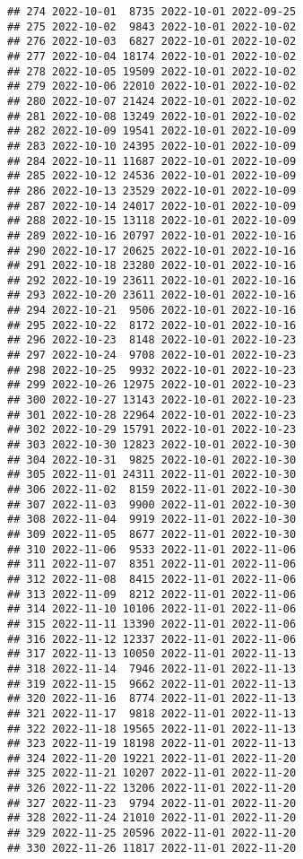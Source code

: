 \documentclass[
]{article}
\begin{document}
\begin{verbatim}
## 274 2022-10-01  8735 2022-10-01 2022-09-25
## 275 2022-10-02  9843 2022-10-01 2022-10-02
## 276 2022-10-03  6827 2022-10-01 2022-10-02
## 277 2022-10-04 18174 2022-10-01 2022-10-02
## 278 2022-10-05 19509 2022-10-01 2022-10-02
## 279 2022-10-06 22010 2022-10-01 2022-10-02
## 280 2022-10-07 21424 2022-10-01 2022-10-02
## 281 2022-10-08 13249 2022-10-01 2022-10-02
## 282 2022-10-09 19541 2022-10-01 2022-10-09
## 283 2022-10-10 24395 2022-10-01 2022-10-09
## 284 2022-10-11 11687 2022-10-01 2022-10-09
## 285 2022-10-12 24536 2022-10-01 2022-10-09
## 286 2022-10-13 23529 2022-10-01 2022-10-09
## 287 2022-10-14 24017 2022-10-01 2022-10-09
## 288 2022-10-15 13118 2022-10-01 2022-10-09
## 289 2022-10-16 20797 2022-10-01 2022-10-16
## 290 2022-10-17 20625 2022-10-01 2022-10-16
## 291 2022-10-18 23280 2022-10-01 2022-10-16
## 292 2022-10-19 23611 2022-10-01 2022-10-16
## 293 2022-10-20 23611 2022-10-01 2022-10-16
## 294 2022-10-21  9506 2022-10-01 2022-10-16
## 295 2022-10-22  8172 2022-10-01 2022-10-16
## 296 2022-10-23  8148 2022-10-01 2022-10-23
## 297 2022-10-24  9708 2022-10-01 2022-10-23
## 298 2022-10-25  9932 2022-10-01 2022-10-23
## 299 2022-10-26 12975 2022-10-01 2022-10-23
## 300 2022-10-27 13143 2022-10-01 2022-10-23
## 301 2022-10-28 22964 2022-10-01 2022-10-23
## 302 2022-10-29 15791 2022-10-01 2022-10-23
## 303 2022-10-30 12823 2022-10-01 2022-10-30
## 304 2022-10-31  9825 2022-10-01 2022-10-30
## 305 2022-11-01 24311 2022-11-01 2022-10-30
## 306 2022-11-02  8159 2022-11-01 2022-10-30
## 307 2022-11-03  9900 2022-11-01 2022-10-30
## 308 2022-11-04  9919 2022-11-01 2022-10-30
## 309 2022-11-05  8677 2022-11-01 2022-10-30
## 310 2022-11-06  9533 2022-11-01 2022-11-06
## 311 2022-11-07  8351 2022-11-01 2022-11-06
## 312 2022-11-08  8415 2022-11-01 2022-11-06
## 313 2022-11-09  8212 2022-11-01 2022-11-06
## 314 2022-11-10 10106 2022-11-01 2022-11-06
## 315 2022-11-11 13390 2022-11-01 2022-11-06
## 316 2022-11-12 12337 2022-11-01 2022-11-06
## 317 2022-11-13 10050 2022-11-01 2022-11-13
## 318 2022-11-14  7946 2022-11-01 2022-11-13
## 319 2022-11-15  9662 2022-11-01 2022-11-13
## 320 2022-11-16  8774 2022-11-01 2022-11-13
## 321 2022-11-17  9818 2022-11-01 2022-11-13
## 322 2022-11-18 19565 2022-11-01 2022-11-13
## 323 2022-11-19 18198 2022-11-01 2022-11-13
## 324 2022-11-20 19221 2022-11-01 2022-11-20
## 325 2022-11-21 10207 2022-11-01 2022-11-20
## 326 2022-11-22 13206 2022-11-01 2022-11-20
## 327 2022-11-23  9794 2022-11-01 2022-11-20
## 328 2022-11-24 21010 2022-11-01 2022-11-20
## 329 2022-11-25 20596 2022-11-01 2022-11-20
## 330 2022-11-26 11817 2022-11-01 2022-11-20

\end{verbatim}
\end{document}
